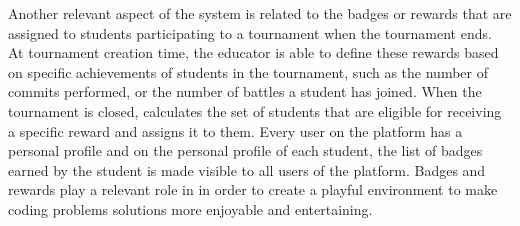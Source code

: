 	Another relevant aspect of the \app system is related to the badges or rewards that are assigned to students participating to a tournament when the tournament ends. At tournament creation time, the educator is able to define these rewards based on specific achievements of students in the tournament, such as the number of commits performed, or the number of battles a student has joined.
	When the tournament is closed, \app calculates the set of students that are eligible for receiving a specific reward and assigns it to them. Every user on the \app platform has a personal profile and on the personal profile of each student, the list of badges earned by the student is made visible to all users of the platform.
	Badges and rewards play a relevant role in \app in order to create a playful environment to make coding problems solutions more enjoyable and entertaining.
